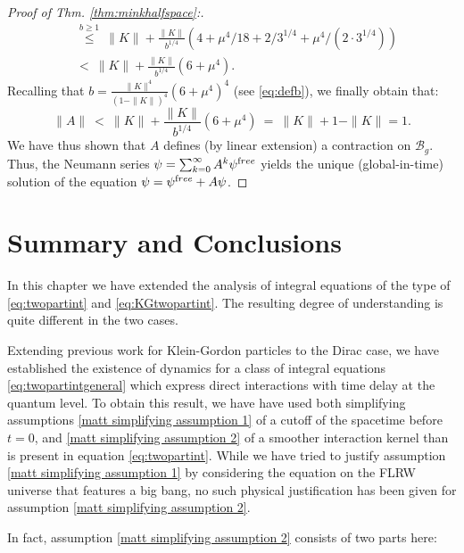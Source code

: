 \documentclass[b5paper,draft,openbib,12pt]{memoir}
\newcommand{\free}{{\textup free}}
\newcommand{\Banach}{\mathscr{B}}
\begin{document}
\begin{proof}[Proof of Thm. \ref{thm:minkhalfspace}:]
\begin{align}
&\overset{b\ge 1}{\le}~ \|K\| + \frac{\|K\|}{b^{1/4}} \left(4+ \mu^4/18 + 2/3^{1/4} + \mu^4/(2 \cdot 3^{1/4})\right)\\
&<~ \|K\| + \frac{\|K\|}{b^{1/4}} (6 + \mu^4 ).
\end{align}
Recalling that $b=\frac{\|K\|^4}{(1-\|K\|)^4} (6+\mu^4)^4$ (see 
\eqref{eq:defb}), we finally obtain that:
\begin{equation}
	\|A\| ~<~ \|K\| + \frac{\|K\|}{b^{1/4}} (6 + \mu^4 ) ~= ~ \|K\| + 1-\|K\| =1.
\end{equation}
We have thus shown that $A$ defines (by linear extension) a 
contraction on $\Banach_g$. Thus, the Neumann series 
$\psi = \sum_{k=0}^\infty A^k \psi^\free$ yields the unique 
(global-in-time) solution of the equation 
\(\psi=\psi^\free+A\psi\). 
\end{proof}


\section{Summary and Conclusions}
In this chapter we have extended 
the analysis of integral equations 
of the type of \eqref{eq:twopartint} and \eqref{eq:KGtwopartint}.
The resulting degree of understanding is quite different 
in the two cases.

Extending previous work for Klein-Gordon particles 
\cite{mtve,lienertcurved} to the Dirac case, we have established the 
existence of dynamics for a class of integral equations 
\eqref{eq:twopartintgeneral} which express 
direct interactions with time delay at the quantum level. To obtain 
this result, we have have used both simplifying assumptions 
\ref{matt simplifying assumption 1} of a cutoff of the spacetime before $t=0$, 
and \ref{matt simplifying assumption 2} of a smoother interaction 
kernel than is present in equation \eqref{eq:twopartint}. While we have tried
to justify assumption \ref{matt simplifying assumption 1}  
by considering the equation on the FLRW universe that features a 
big bang, no such physical justification has been given for 
assumption \ref{matt simplifying assumption 2}.

In fact, assumption \ref{matt simplifying assumption 2} consists 
of two parts here:
\end{document}
